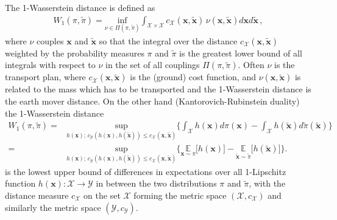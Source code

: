 The 1-Wasserstein distance is defined as
\begin{align}
	W_1(\pi,\tilde{\pi}) = \underset{  \nu \in \Pi(\pi,\tilde{\pi}) }{ \text{inf}}\int_{\mathcal{X} \times \mathcal{X}} c_{\mathcal{X}}(\bm{x},\tilde{\bm{x}}) \, \nu(\bm{x},\tilde{\bm{x}}) d\bm{x} d\tilde{\bm{x}}
	\label{eq:wass} \, ,
\end{align}
where $\nu$ couples $\bm{x}$ and $\tilde{\bm{x}}$ so that the integral over the distance $c_{\mathcal{X}}(\bm{x},\tilde{\bm{x}}) $ weighted by the probability measures $\pi$ and $\tilde{\pi}$ is the greatest lower bound of all integrals with respect to $\nu$ in the set of all couplings $ \Pi(\pi,\tilde{\pi})$.
Often $\nu$ is the transport plan, where $c_{\mathcal{X}}(\bm{x},\tilde{\bm{x}})$ is the (ground) cost function, and $\nu(\bm{x}, \tilde{\bm{x}})$ is related to the mass which has to be transported and the 1-Wasserstein distance is the earth mover distance.
On the other hand (Kantorovich-Rubinstein duality) the 1-Wasserstein distance
\begin{align}
	W_1(\pi,\tilde{\pi})  =& \underset{ h(\bm{x}); \, c_{\mathcal{Y}}(h(\bm{x}), h(\tilde{\bm{x}}) ) \leq  c_{\mathcal{X}}(\bm{x},\tilde{\bm{x}}) }{ \text{sup}} \Bigg\{  \int_{\mathcal{X}} h(\bm{x}) d \pi (\bm{x})  - \int_{\mathcal{X}} h(\tilde{\bm{x}}) d \tilde{\pi} (\tilde{\bm{x}}) \Bigg\} \\
	=& \underset{ h(\bm{x});  \, c_{\mathcal{Y}}(h(\bm{x}), h(\tilde{\bm{x}}) )  \leq  c_{\mathcal{X}}(\bm{x},\tilde{\bm{x}}) }{ \text{sup}}  \Bigg\{  \underset{\bm{x} \sim  \pi }{\mathbb{E}} \big[ h(\bm{x}) \big]  -  \underset{\tilde{\bm{x}}\sim \tilde{\pi}}{\mathbb{E}} \big[ h(\tilde{\bm{x}}) \big] \Bigg\} .
\end{align}
is the lowest upper bound of differences in expectations over all 1-Lipschitz function $h(\bm{x}) : \mathcal{X} \rightarrow \mathcal{Y}$ in between the two distributions $\pi$ and $\tilde{\pi}$, with the distance measure $c_{\mathcal{X}}$ on the set $\mathcal{X}$ forming the metric space $( \mathcal{X}, c_{\mathcal{X}} )$ and similarly the metric space $(\mathcal{Y}, c_{\mathcal{Y}})$.

